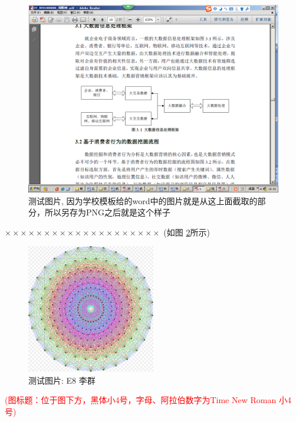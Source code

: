 \documentclass[a4paper]{article}
\theoremstyle{definition} \newtheorem{law}[thm]{Law}
\theoremstyle{plain} \newtheorem{jury}[thm]{Jury}
\theoremstyle{remark} \newtheorem*{marg}{Margaret}
\newcommand{\reffig}[1]{图 \ref{#1}}
\begin{document}
\begin{figure}[H]
	\centering
	\includegraphics[width=\textwidth]{testmindmap}
	\caption{测试图片, 因为学校模板给的word中的图片就是从这上面截取的部分，所以另存为PNG之后就是这个样子}
	\label{testfig}
\end{figure}

$ \times\times\times\times\times\times\times\times\times\times\times\times\times\times\times\times\times\times\times\times $  (如\reffig{E8}所示)

\begin{figure}[H]
	\centering
	\includegraphics[width=0.5\textwidth]{E8Petrie}
	\caption{测试图片: E8 李群}
	\label{E8}
\end{figure}

\textcolor{red}{(图标题：位于图下方，黑体小4号，字母、阿拉伯数字为Time New Roman 小4号)}
\end{document}
